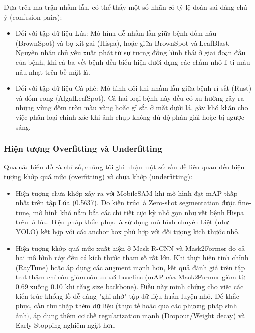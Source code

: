 Dựa trên ma trận nhầm lẫn, có thể thấy một số nhãn có tỷ lệ đoán sai đáng chú ý (confusion pairs):
\begin{itemize}
  \item Đối với tập dữ liệu Lúa: Mô hình dễ nhầm lẫn giữa bệnh đốm nâu (BrownSpot) và bọ xít gai (Hispa), hoặc giữa BrownSpot và LeafBlast. Nguyên nhân chủ yếu xuất phát từ sự tương đồng hình thái ở giai đoạn đầu của bệnh, khi cả ba vết bệnh đều biểu hiện dưới dạng các chấm nhỏ li ti màu nâu nhạt trên bề mặt lá.
  \item Đối với tập dữ liệu Cà phê: Mô hình đôi khi nhầm lẫn giữa bệnh rỉ sắt (Rust) và đốm rong (AlgalLeafSpot). Cả hai loại bệnh này đều có xu hướng gây ra những vùng đốm tròn màu vàng hoặc gỉ sắt ở mặt dưới lá, gây khó khăn cho việc phân loại chính xác khi ảnh chụp không đủ độ phân giải hoặc bị ngược sáng.
\end{itemize}

\subsubsection{Hiện tượng Overfitting và Underfitting}
Qua các biểu đồ và chỉ số, chúng tôi ghi nhận một số vấn đề liên quan đến hiện tượng khớp quá mức (overfitting) và chưa khớp (underfitting):
\begin{itemize}
  \item Hiện tượng chưa khớp xảy ra với MobileSAM khi mô hình đạt mAP thấp nhất trên tập Lúa (0.5637). Do kiến trúc là Zero-shot segmentation được fine-tune, mô hình khó nắm bắt các chi tiết cực kỳ nhỏ gọn như vết bệnh Hispa trên lá lúa. Biện pháp khắc phục là sử dụng mô hình chuyên biệt (như YOLO) kết hợp với các anchor box phù hợp với đối tượng kích thước nhỏ.
  \item Hiện tượng khớp quá mức xuất hiện ở Mask R-CNN và Mask2Former do cả hai mô hình này đều có kích thước tham số rất lớn. Khi thực hiện tinh chỉnh (RayTune) hoặc áp dụng các augment mạnh hơn, kết quả đánh giá trên tập test thậm chí còn giảm sâu so với baseline (mAP của Mask2Former giảm từ 0.69 xuống 0.10 khi tăng size backbone). Điều này minh chứng cho việc các kiến trúc khổng lồ dễ dàng "ghi nhớ" tập dữ liệu huấn luyện nhỏ. Để khắc phục, cần thu thập thêm dữ liệu (thực tế hoặc qua các phương pháp sinh ảnh), áp dụng thêm cơ chế regularization mạnh (Dropout/Weight decay) và Early Stopping nghiêm ngặt hơn.
\end{itemize}


